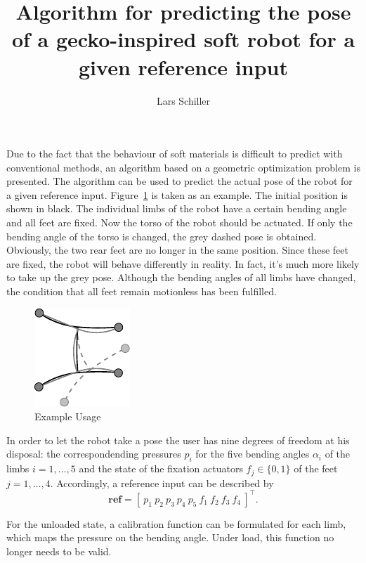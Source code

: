 \documentclass[10pt,a4paper]{article}
\author{Lars Schiller}
\title{Algorithm for predicting the pose of a gecko-inspired soft robot for a given reference input}
\begin{document}
\maketitle

Due to the fact that the behaviour of soft materials is difficult to predict with conventional methods, an algorithm based on a geometric optimization problem is presented.
The algorithm can be used to predict the actual pose of the robot for a given reference input.
Figure~\ref{fig:example} is taken as an example. The initial position is shown in black. 
The individual limbs of the robot have a certain bending angle and all feet are fixed.
Now the torso of the robot should be actuated. 
If only the bending angle of the torso is changed, the grey dashed pose is obtained. 
Obviously, the two rear feet are no longer in the same position. 
Since these feet are fixed, the robot will behave differently in reality. 
In fact, it's much more likely to take up the grey pose. 
Although the bending angles of all limbs have changed, the condition that all feet remain motionless has been fulfilled.

\begin{figure}[h]
\centering\includegraphics[scale=1]{../Pics/intro/intro.pdf}
\caption{Example Usage}
\label{fig:example}
\end{figure}

In order to let the robot take a pose
the user has nine degrees of freedom at his disposal: 
the correspondending pressures $p_i$ for the five bending angles $\alpha_i$ of the limbs $i=1,\dots,5$ and the state of the fixation actuators $f_j \in \{0,1\}$ of the feet $j=1,\dots,4$.
Accordingly, a reference input can be described by
\begin{equation}
\bm{ref} = \left[~ p_1~p_2~p_3~p_4~p_5~f_1~f_2~f_3~f_4~ \right]^\top.
\end{equation}

For the unloaded state, a calibration function can be formulated for each limb, which maps the pressure on the bending angle.
Under load, this function no longer needs to be valid.
\end{document}
